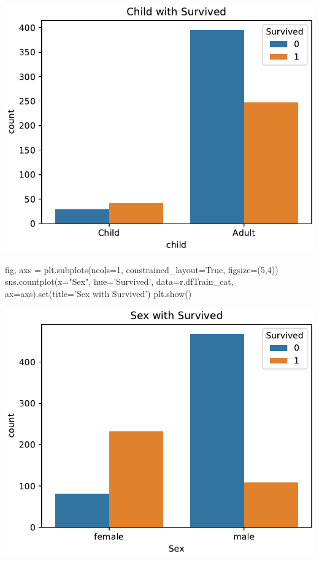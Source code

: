 \documentclass[
]{article}
\newenvironment{Shaded}{\begin{snugshade}}{\end{snugshade}}
\newcommand{\BuiltInTok}[1]{\textcolor[rgb]{0.80,0.80,0.80}{#1}}
\newcommand{\DecValTok}[1]{\textcolor[rgb]{0.86,0.86,0.80}{#1}}
\newcommand{\NormalTok}[1]{\textcolor[rgb]{0.80,0.80,0.80}{#1}}
\newcommand{\OperatorTok}[1]{\textcolor[rgb]{0.94,0.94,0.82}{#1}}
\newcommand{\StringTok}[1]{\textcolor[rgb]{0.80,0.58,0.58}{#1}}
\newcommand{\VariableTok}[1]{\textcolor[rgb]{0.80,0.80,0.80}{#1}}
\begin{document}
\includegraphics{m2851_PRA2_aruizplaza_rcotillas_files/figure-latex/unnamed-chunk-40-1.pdf}

\begin{Shaded}
\begin{Highlighting}[]
\NormalTok{fig, axs }\OperatorTok{=}\NormalTok{ plt.subplots(ncols}\OperatorTok{=}\DecValTok{1}\NormalTok{, constrained_layout}\OperatorTok{=}\VariableTok{True}\NormalTok{, figsize}\OperatorTok{=}\NormalTok{(}\DecValTok{5}\NormalTok{,}\DecValTok{4}\NormalTok{))}
\NormalTok{sns.countplot(x}\OperatorTok{=}\StringTok{"Sex"}\NormalTok{, hue}\OperatorTok{=}\StringTok{'Survived'}\NormalTok{, data}\OperatorTok{=}\NormalTok{r.dfTrain_cat, ax}\OperatorTok{=}\NormalTok{axs).}\BuiltInTok{set}\NormalTok{(title}\OperatorTok{=}\StringTok{'Sex with Survived'}\NormalTok{)}
\NormalTok{plt.show()}
\end{Highlighting}
\end{Shaded}

\includegraphics{m2851_PRA2_aruizplaza_rcotillas_files/figure-latex/unnamed-chunk-41-1.pdf}
\end{document}
